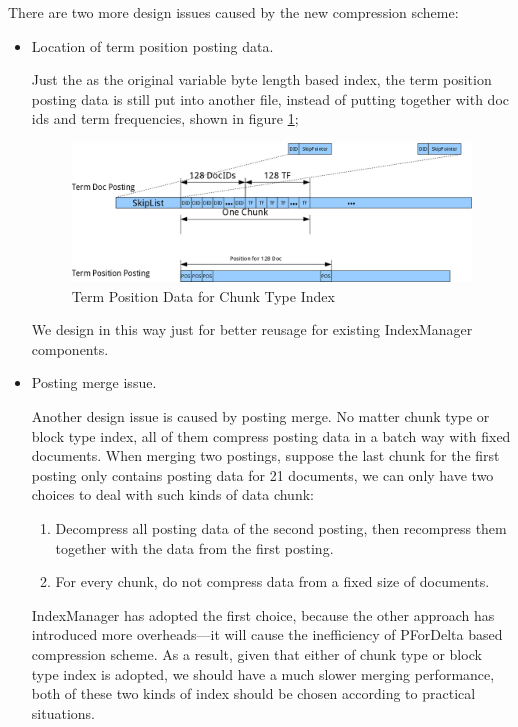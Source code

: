 There are two more design issues caused by the new compression scheme:
\begin{itemize}
 \item Location of term position posting data. \par
Just the as the original variable byte length based index, the term position posting data is still put into another file, instead of putting together with doc ids and term frequencies, shown
in figure \ref{termpos-chunk};

\begin{figure}[h!]
\centerline{\includegraphics[width=.8\textwidth]{Figures/termpos.png}}
\caption{Term Position Data for Chunk Type Index}\label{termpos-chunk}
\end{figure}

We design in this way just for better reusage for existing IndexManager components.
 \item Posting merge issue. \par
Another design issue is caused by posting merge. No matter chunk type or block type index, all of them compress posting data in a batch way with fixed documents. When merging two 
postings, suppose the last chunk for the first posting only contains posting data for 21 documents, we can only have two choices to deal with such kinds of data chunk:
\begin{enumerate}
 \item Decompress all posting data of the second posting, then recompress them together with the data from the first posting.
 \item For every chunk, do not compress data from a fixed size of documents.
\end{enumerate}
IndexManager has adopted the first choice, because the other approach has introduced more overheads---it will cause the inefficiency of PForDelta based compression scheme. 
As a result, given that either of chunk type or block type index is adopted, we should have a much slower merging performance, both of these two kinds of index should be chosen according
to practical situations.
\end{itemize}

